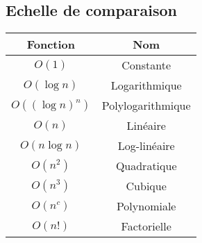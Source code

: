 \documentclass{article}
\begin{document}
\subsection{Echelle de comparaison}
\begin{center} %
    \begin{tabular}{|c|c|}
        \hline
        Fonction & Nom \\
        \hline
        $O(1)$ & Constante \\
        \hline
        $O(\log n)$ & Logarithmique \\
        \hline
        $O((\log n)^n)$ & Polylogarithmique \\
        \hline
        $O(n)$ & Linéaire \\
        \hline
        $O(n \log n)$ & Log-linéaire \\
        \hline
        $O(n^2)$ & Quadratique \\
        \hline
        $O(n^3)$ & Cubique \\
        \hline
        $O(n^c)$ & Polynomiale \\
        \hline
        $O(n!)$ & Factorielle \\
        \hline
    \end{tabular}

\end{center}
\end{document}
